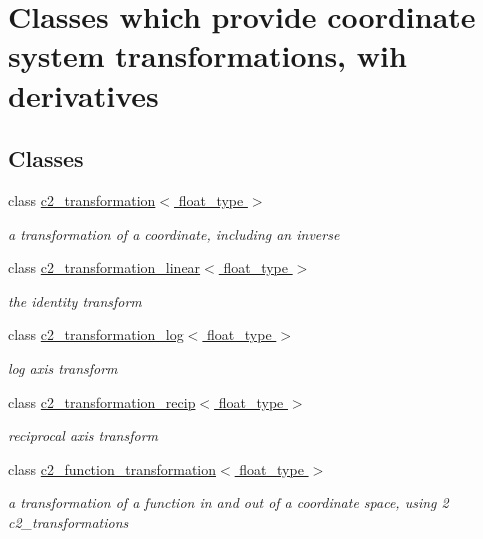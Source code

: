 \hypertarget{group__transforms}{}\section{Classes which provide coordinate system transformations, wih derivatives}
\label{group__transforms}
\subsection*{Classes}
\begin{DoxyCompactItemize}
\item 
class \hyperlink{classc2__transformation}{c2\+\_\+transformation$<$ float\+\_\+type $>$}
\begin{DoxyCompactList}\small\item\em a transformation of a coordinate, including an inverse \end{DoxyCompactList}\item 
class \hyperlink{classc2__transformation__linear}{c2\+\_\+transformation\+\_\+linear$<$ float\+\_\+type $>$}
\begin{DoxyCompactList}\small\item\em the identity transform \end{DoxyCompactList}\item 
class \hyperlink{classc2__transformation__log}{c2\+\_\+transformation\+\_\+log$<$ float\+\_\+type $>$}
\begin{DoxyCompactList}\small\item\em log axis transform \end{DoxyCompactList}\item 
class \hyperlink{classc2__transformation__recip}{c2\+\_\+transformation\+\_\+recip$<$ float\+\_\+type $>$}
\begin{DoxyCompactList}\small\item\em reciprocal axis transform \end{DoxyCompactList}\item 
class \hyperlink{classc2__function__transformation}{c2\+\_\+function\+\_\+transformation$<$ float\+\_\+type $>$}
\begin{DoxyCompactList}\small\item\em a transformation of a function in and out of a coordinate space, using 2 c2\+\_\+transformations \end{DoxyCompactList}\item 

\end{DoxyCompactItemize}
